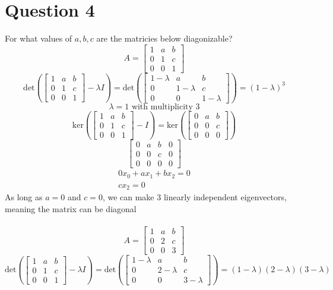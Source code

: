 \documentclass[hidelinks]{article}
\begin{document}
\section{Question 4}
For what values of $a, b, c$ are the matricies below diagonizable?
\[
	A = \begin{bmatrix} 1 & a & b \\ 0 & 1 & c \\ 0 & 0 & 1\end{bmatrix}
\]
\[
	\text{det}(\begin{bmatrix} 1 & a & b \\ 0 & 1 & c \\ 0 & 0 & 1\end{bmatrix} - \lambda I) =
	\text{det}(\begin{bmatrix} 1 -\lambda& a & b \\ 0 & 1 -\lambda & c \\ 0 & 0 & 1 -\lambda\end{bmatrix}) = (1- \lambda)^3 
\]
\[
	\lambda = 1 \text{ with multiplicity 3}
\]
\[
	\text{ker}(\begin{bmatrix} 1 & a & b \\ 0 & 1 & c \\ 0 & 0 & 1\end{bmatrix} - I) = \text{ker}(\begin{bmatrix} 0 & a & b \\ 0 & 0 & c \\ 0 & 0 & 0\end{bmatrix}) 
\]
\[
	\begin{bmatrix} 0 & a & b & 0 \\ 0 & 0 & c & 0 \\ 0 & 0 & 0 & 0\end{bmatrix} 
\]
\begin{align*}
	0x_0 + ax_1 + bx_2 = 0 \\
	cx_2 = 0
\end{align*}
As long as $a = 0$ and $c = 0$, we can make 3 linearly independent eigenvectors, meaning the matrix can be diagonal
\\
\\
\[
	A = \begin{bmatrix} 1 & a & b \\ 0 & 2 & c \\ 0 & 0 & 3\end{bmatrix}
\]
\[
	\text{det}(\begin{bmatrix} 1 & a & b \\ 0 & 1 & c \\ 0 & 0 & 1\end{bmatrix} - \lambda I) =
	\text{det}(\begin{bmatrix} 1 -\lambda& a & b \\ 0 & 2 -\lambda & c \\ 0 & 0 & 3 -\lambda\end{bmatrix}) = (1- \lambda)(2 - \lambda)(3 - \lambda) 
\]
\end{document}
